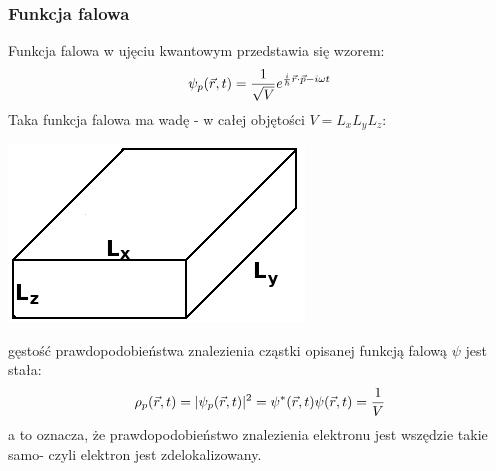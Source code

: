 \subsubsection{Funkcja falowa}
Funkcja falowa w ujęciu kwantowym przedstawia się wzorem:
\begin{equation} \psi_p(\vec{r},t)=\frac{1}{\sqrt{V}}e^{\frac{i}{\hbar}\vec{r}\cdot\vec{p}-i\omega t}
\end{equation}
Taka funkcja falowa ma wadę - w całej objętości $V=L_xL_yL_z$:
\begin{center}\includegraphics[scale=0.5]{obrazki/wykl_8_obrazek0.png}\end{center}
 gęstość prawdopodobieństwa znalezienia cząstki opisanej funkcją falową $\psi$ jest stała:
\begin{equation}\rho_p(\vec{r},t)=|\psi_p(\vec{r},t)|^2=\psi^*(\vec{r},t)\psi(\vec{r},t)=\frac{1}{V}
\end{equation}
a to oznacza, że prawdopodobieństwo znalezienia elektronu jest wszędzie takie samo- czyli elektron jest zdelokalizowany. 

